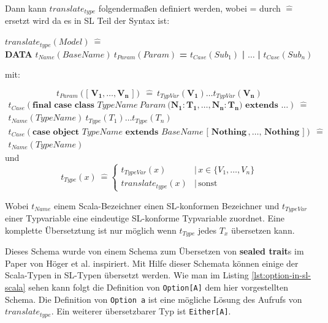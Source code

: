 \documentclass[12pt,bibtotoc]{scrreprt}
\begin{document}
Dann kann $translate_{type}$ folgendermaßen definiert werden, wobei = durch $\hat{=}$ ersetzt wird da es in SL Teil der Syntax ist:

\begin{centering}
$translate_{type}(Model)\:\hat{=}$\\
\textbf{DATA} $t_{Name}(BaseName)\:t_{Param}(Param)$ \textbf{=} $t_{Case}(Sub_1)$ \textbf{|} $\dots$ \textbf{|} $t_{Case}(Sub_n)$\\
\end{centering}

mit:

\begin{equation*}
t_{Param}( \textbf{[ } \mathbf{V_1, \dots, V_n} \textbf{ ]} )\:\hat{=}\: t_{TypVar}(\mathbf{V_1} ) \dots t_{TypVar}(\mathbf{V_n} )
\end{equation*}
\begin{gather*}
t_{Case}(\textbf{final case class }TypeName \: Param\:\textbf{(}\mathbf{N_1:T_1, \dots, N_n:T_n}\textbf{)} \textbf{ extends }\dots )\:\hat{=}\\t_{Name}(TypeName)\:t_{Type}(T_1) \dots t_{Type}(T_n)\\
t_{Case}(\textbf{case object } TypeName\textbf{ extends }BaseName\textbf{ [ Nothing}\, ,\dots,\,\textbf{Nothing ]})\:\hat{=}\\
t_{Name}(TypeName)
\end{gather*}
und
\begin{equation*}
t_{Type}(x)\:\hat{=} \begin{cases}
        t_{TypeVar}(x)  &|\, x \in \{V_1, \dots , V_n\}\\
        translate_{type}(x) &|\, \text{sonst}
        \end{cases}
\end{equation*}

Wobei $t_{Name}$ einem Scala-Bezeichner einen SL-konformen Bezeichner  und $t_{TypeVar}$ einer Typvariable eine eindeutige SL-konforme Typvariable zuordnet. Eine komplette Übersetztung ist nur möglich wenn $t_{Type}$ jedes $T_x$ übersetzen kann.

Dieses Schema wurde von einem Schema zum Übersetzen von \textbf{sealed trait}s im Paper von Höger et al.\cite{Hoger2013} inspiriert. Mit Hilfe dieser Schemata können einige der Scala-Typen in SL-Typen übersetzt werden. Wie man im Listing \ref{lst:option-in-sl-scala} sehen kann folgt die Definition von \lstinline!Option[A]! dem hier vorgestellten Schema. Die Definition von \lstinline!Option a! ist eine mögliche Lösung des Aufrufs von $translate_{type}$. Ein weiterer übersetzbarer Typ ist \lstinline!Either[A]!.
\end{document}
